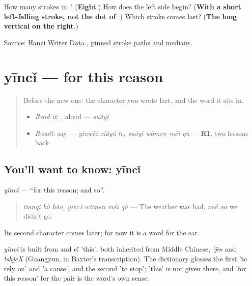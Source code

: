 \begin{tcolorbox}[breakable,colback=teal!4,colframe=teal!35!black,title={Before you move on}]
How many strokes in ? (\textbf{Eight}.) How does the left side begin? (\textbf{With a short left-falling stroke, not the dot of }.) Which stroke comes last? (\textbf{The long vertical on the right}.)

Source: \href{https://raw.githubusercontent.com/chanind/hanzi-writer-data/68d10a4b21150cae5e1ebbd223eed289cf32d90c/data/\%E6\%89\%80.json}{Hanzi Writer Data , pinned stroke paths and medians}.
\end{tcolorbox}
\section[yīncǐ]{yīncǐ — for this reason}

\label{lesson:ZH-C281-yinci}



\begin{quote}
Before the new one: the character you wrote last, and the word it sits in.

\begin{itemize}
\raggedright
  \item \emph{Read it:} , aloud — \emph{suǒyǐ}
  \item \emph{Recall:} say   — \emph{yīnwèi xiàyǔ le, suǒyǐ wǒmen méi qù} — \textbf{R1}, two lessons back
\end{itemize}
\end{quote}

\subsection*{You'll want to know: yīncǐ}
\emph{yīncǐ} — \textquotedblleft{}for this reason; and so\textquotedblright{}.

\begin{quote}
\emph{tiānqì bù hǎo, yīncǐ wǒmen méi qù} — The weather was bad, and so we didn't go.
\end{quote}

Its second character comes later; for now it is a word for the ear.

\begin{cousinweb}
\emph{yīncǐ} is built from  and cǐ 'this', both inherited from Middle Chinese, \emph{'jin} and \emph{tshjeX} (Guangyun, in Baxter's transcription). The dictionary glosses the first 'to rely on' and 'a cause', and the second 'to stop'; 'this' is not given there, and 'for this reason' for the pair is the word's own sense.
\end{cousinweb}

